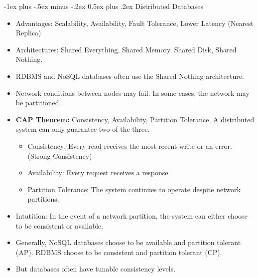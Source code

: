 \documentclass[10pt, landscape]{article}
\makeatletter
\renewcommand{\section}{\@startsection{section}{1}{0mm}%
  {-1ex plus -.5ex minus -.2ex}%
  {0.5ex plus .2ex}%
{\normalfont\large\bfseries}}
\makeatother
\begin{document}
\begin{multicols*}{4}
  \section{Distributed Databases}
  \begin{itemize}
    \item Advantages: Scalability, Availability, Fault Tolerance, Lower Latency (Nearest Replica)
    \item Architectures: Shared Everything, Shared Memory, Shared Disk, Shared Nothing.
    \item RDBMS and NoSQL databases often use the Shared Nothing architecture.
    \item Network conditions between nodes may fail. In some cases, the network may be partitioned.
    \item \textbf{CAP Theorem:} Consistency, Availability, Partition Tolerance. A distributed system can only guarantee two of the three.
    \begin{itemize}
      \item Consistency: Every read receives the most recent write or an error. (Strong Consistency)
      \item Availability: Every request receives a response.
      \item Partition Tolerance: The system continues to operate despite network partitions.
    \end{itemize}
    \item Intutition: In the event of a network partition, the system can either choose to be consistent or available.
    \item Generally, NoSQL databases choose to be available and partition tolerant (AP). RDBMS choose to be consistent and partition tolerant (CP).
    \item But databases often have tunable consistency levels.
  \end{itemize}


\end{multicols*}
\end{document}
